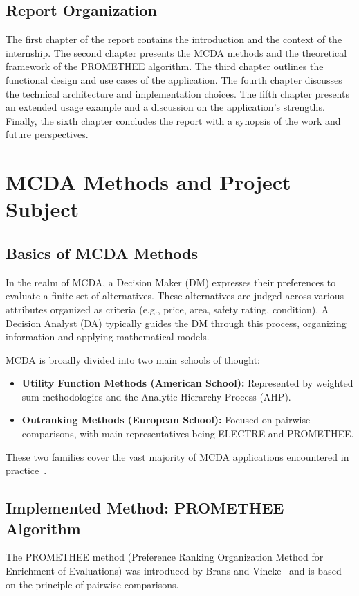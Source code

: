 \documentclass[12pt,a4paper,oneside]{report}
\begin{document}
\section{Report Organization}
The first chapter of the report contains the introduction and the context of the internship. The second chapter presents the MCDA methods and the theoretical framework of the PROMETHEE algorithm. The third chapter outlines the functional design and use cases of the application. The fourth chapter discusses the technical architecture and implementation choices. The fifth chapter presents an extended usage example and a discussion on the application's strengths. Finally, the sixth chapter concludes the report with a synopsis of the work and future perspectives.

\chapter{MCDA Methods and Project Subject}

\section{Basics of MCDA Methods}
In the realm of MCDA, a Decision Maker (DM) expresses their preferences to evaluate a finite set of alternatives. These alternatives are judged across various attributes organized as criteria (e.g., price, area, safety rating, condition). A Decision Analyst (DA) typically guides the DM through this process, organizing information and applying mathematical models. 

MCDA is broadly divided into two main schools of thought:
\begin{itemize}
    \item \textbf{Utility Function Methods (American School):} Represented by weighted sum methodologies and the Analytic Hierarchy Process (AHP).
    \item \textbf{Outranking Methods (European School):} Focused on pairwise comparisons, with main representatives being ELECTRE and PROMETHEE.
\end{itemize}
These two families cover the vast majority of MCDA applications encountered in practice~\cite{belton2002}.

\section{Implemented Method: PROMETHEE Algorithm}
The PROMETHEE method (Preference Ranking Organization Method for Enrichment of Evaluations) was introduced by Brans and Vincke~\cite{brans1985} and is based on the principle of pairwise comparisons.
\end{document}
